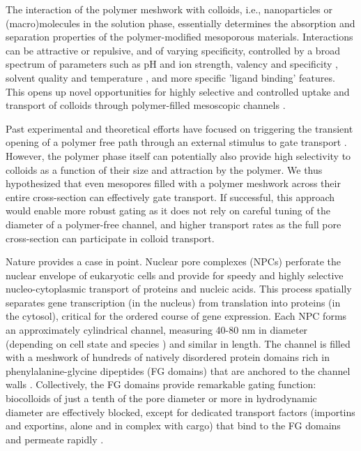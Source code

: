 \documentclass[12pt, a4paper]{article}
\begin{document}
The interaction of the polymer meshwork with colloids, i.e., nanoparticles or (macro)molecules in the solution phase, essentially determines the absorption and separation properties of the polymer-modified mesoporous materials.
Interactions can be attractive or repulsive, and of varying specificity, controlled by a broad spectrum of parameters \cite{Low2019} such as pH and ion strength, valency and specificity \cite{Lee2010}, solvent quality and temperature \cite{Halperin2011, Stetsyshyn2020}, and more specific 'ligand binding' features.
This opens up novel opportunities for highly selective and controlled uptake and transport of colloids through polymer-filled mesoscopic channels \cite{Sirkin2020, Smook2025}.

Past experimental and theoretical efforts have focused on triggering the transient opening of a polymer free path through an external stimulus to gate transport \cite{Alberti2015, Emilsson2018, Caspi2008, Smook2025}.
However, the polymer phase itself can potentially also provide high selectivity to colloids as a function of their size and attraction by the polymer.
We thus hypothesized that even mesopores filled with a polymer meshwork across their entire cross-section can effectively gate transport.
If successful, this approach would enable more robust gating as it does not rely on careful tuning of the diameter of a polymer-free channel, and higher transport rates as the full pore cross-section can participate in colloid transport.

Nature provides a case in point.
Nuclear pore complexes (NPCs) perforate the nuclear envelope of eukaryotic cells and provide for speedy and highly selective nucleo-cytoplasmic transport of proteins and nucleic acids.
This process spatially separates gene transcription (in the nucleus) from translation into proteins (in the cytosol), critical for the ordered course of gene expression.
Each NPC forms an approximately cylindrical channel, measuring 40-80 nm in diameter (depending on cell state and species \cite{Zimmerli2021, Schuller2021}) and similar in length.
The channel is filled with a meshwork of hundreds of natively disordered protein domains rich in phenylalanine-glycine dipeptides (FG domains) that are anchored to the channel walls \cite{Ori2013, Rajoo2018, Kim2018, Zimmerli2021}.
Collectively, the FG domains provide remarkable gating function: biocolloids of just a tenth of the pore diameter or more in hydrodynamic diameter are effectively blocked, except for dedicated transport factors (importins and exportins, alone and in complex with cargo) that bind to the FG domains and permeate rapidly \cite{Hoogenboom2021}. 
\end{document}
